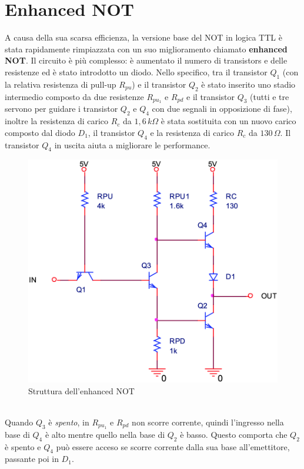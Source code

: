 \documentclass[12pt, a4paper]{report}
\begin{document}
\section{Enhanced NOT}
A causa della sua scarsa efficienza, la versione base del NOT in logica TTL è stata rapidamente rimpiazzata con un suo miglioramento chiamato \textbf{enhanced NOT}. Il circuito è più complesso: è aumentato il numero di transistors e delle resistenze ed è stato introdotto un diodo. Nello specifico, tra il transistor $Q_1$ (con la relativa resistenza di pull-up $R_{pu}$) e il transistor $Q_2$ è stato inserito uno stadio intermedio composto da due resistenze $R_{pu_1}$ e $R_{pd}$ e il transistor $Q_3$ (tutti e tre servono per guidare i transistor $Q_2$ e $Q_4$ con due segnali in opposizione di fase), inoltre la resistenza di carico $R_c$ da $1,6\,k\Omega$ è stata sostituita con un nuovo carico composto dal diodo $D_1$, il transistor $Q_4$ e la resistenza di carico $R_c$ da $130\,\Omega$. Il transistor $Q_4$ in uscita aiuta a migliorare le performance. 
\begin{figure}[h]
    \centering
    \includegraphics[scale=0.4,angle=0]{ttl_not_enh.png}
    \caption{Struttura dell'enhanced NOT}
    \label{not_enh}
\end{figure}
\\Quando $Q_3$ è \textit{spento}, in $R_{pu_1}$ e $R_{pd}$ non scorre corrente, quindi l'ingresso nella base di $Q_4$ è alto mentre quello nella base di $Q_2$ è basso. Questo comporta che $Q_2$ è spento e $Q_4$ può essere acceso se scorre corrente dalla sua base all'emettitore, passante poi in $D_1$.
\end{document}
